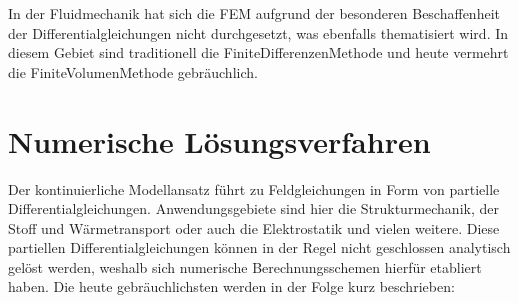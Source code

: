 \documentclass[letterpaper,10pt,german]{jupyterBook}
\begin{document}
\sphinxAtStartPar
In der Fluidmechanik hat sich die FEM aufgrund der besonderen Beschaffenheit der Differentialgleichungen nicht durchgesetzt, was ebenfalls thematisiert wird. In diesem Gebiet sind traditionell die Finite\sphinxhyphen{}Differenzen\sphinxhyphen{}Methode und heute vermehrt die Finite\sphinxhyphen{}Volumen\sphinxhyphen{}Methode gebräuchlich.

\sphinxstepscope


\section{Numerische Lösungsverfahren}
\label{\detokenize{chapters/chapter1/Einf_xfchrung_Loesungsverfahren:numerische-losungsverfahren}}\label{\detokenize{chapters/chapter1/Einf_xfchrung_Loesungsverfahren::doc}}
\sphinxAtStartPar
Der kontinuierliche Modellansatz führt zu Feldgleichungen in Form von partielle Differentialgleichungen. Anwendungsgebiete sind hier die Strukturmechanik, der Stoff\sphinxhyphen{} und Wärmetransport oder auch die Elektrostatik  und vielen weitere. Diese partiellen Differentialgleichungen können in der Regel nicht geschlossen analytisch gelöst werden, weshalb sich numerische Berechnungsschemen hierfür etabliert haben. Die heute gebräuchlichsten werden in der Folge kurz beschrieben:
\end{document}
